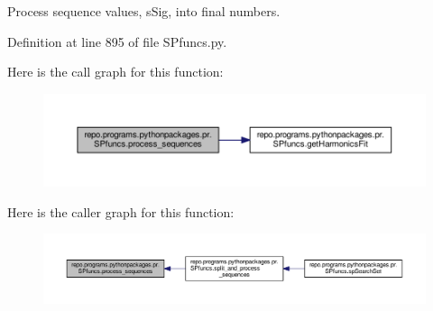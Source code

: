 Process sequence values, s\-Sig, into final numbers. 



Definition at line 895 of file S\-Pfuncs.\-py.



Here is the call graph for this function\-:
\nopagebreak
\begin{figure}[H]
\begin{center}
\leavevmode
\includegraphics[width=350pt]{namespacerepo_1_1programs_1_1pythonpackages_1_1pr_1_1SPfuncs_a98d08fa254a21b0b0895f424f7006dbd_cgraph}
\end{center}
\end{figure}




Here is the caller graph for this function\-:
\nopagebreak
\begin{figure}[H]
\begin{center}
\leavevmode
\includegraphics[width=350pt]{namespacerepo_1_1programs_1_1pythonpackages_1_1pr_1_1SPfuncs_a98d08fa254a21b0b0895f424f7006dbd_icgraph}
\end{center}
\end{figure}


